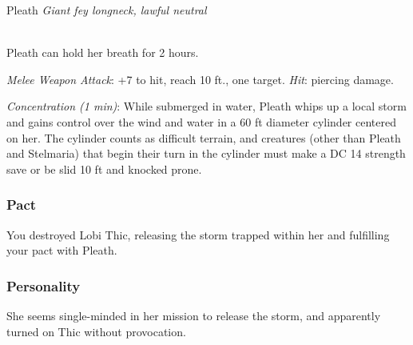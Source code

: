 \documentclass[letterpaper,10pt,twoside,twocolumn,openany]{book}
\begin{document}
\begin{monsterbox}{ Pleath}
	\textit{Giant fey longneck, lawful neutral}\\
	\hline%
	\basics[%
	armorclass = 13 (natural armor),
	hitpoints  = \dice{8d10 + 24},
	speed      = {10 ft., swim 40 ft.}
	]
	\hline%
	\stats[
    STR = \stat{18}, %
    DEX = \stat{15},
    CON = \stat{16},
    INT = \stat{9},
    WIS = \stat{12},
    CHA = \stat{5}
	]
	\hline%
	\details[%
	skills = {Perception + 3, Stealth +5 (when underwater)},
	senses = {pp 13},
	languages = {Longneck, understands Common and Sylvan but cannot speak},
	challenge = 2
	]
	\hline \\[1mm]
	\begin{monsteraction}
		Pleath can hold her breath for 2 hours.
	\end{monsteraction}
	
	\begin{monsteraction}[Bite]
		\emph{Melee Weapon Attack}: +7 to hit, reach 10 ft., one target. \emph{Hit}:  piercing damage.
	\end{monsteraction}
	
	\begin{monsteraction}
		\emph{Concentration (1 min)}: While submerged in water, Pleath whips up a local storm and gains control over the wind and water in a 60 ft diameter cylinder centered on her. The cylinder counts as difficult terrain, and creatures (other than Pleath and Stelmaria) that begin their turn in the cylinder must make a DC 14 strength save or be slid 10 ft and knocked prone.
	\end{monsteraction}

\end{monsterbox}

\subsubsection{Pact}
You destroyed Lobi Thic, releasing the storm trapped within her and fulfilling your pact with Pleath.

\subsubsection{Personality}
She seems single-minded in her mission to release the storm, and apparently turned on Thic without provocation. 
\end{document}
